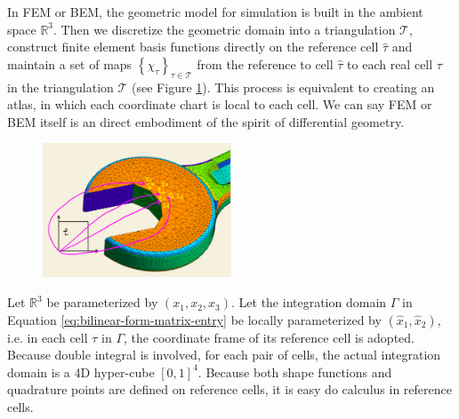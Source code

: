 \documentclass[11pt, a4paper]{book}
\begin{document}
In FEM or BEM, the geometric model for simulation is built in the ambient space
$\mathbb{R}^3$. Then we discretize the geometric domain into a triangulation
$\mathcal{T}$, construct finite element basis functions directly on the reference cell
$\hat{\tau}$ and maintain a set of maps
$\left\{ \chi_{\tau} \right\}_{\tau\in\mathcal{T}}$ from the reference to cell
$\hat{\tau}$ to each real cell $\tau$ in the triangulation $\mathcal{T}$ (see Figure
\ref{fig:mesh-manifold}). This process is equivalent to creating an atlas, in which each
coordinate chart is local to each cell. We can say FEM or BEM itself is an direct
embodiment of the spirit of differential geometry.
\begin{figure}[htbp]
  \centering
  \includegraphics[width=0.5\textwidth, height=\textheight, keepaspectratio]{figures/coordinate-chart-for-mesh-draft}
  \caption{}
  \label{fig:mesh-manifold}
\end{figure}

Let $\mathbb{R}^3$ be parameterized by $(x_1,x_2,x_3)$. Let the integration domain
$\Gamma$ in Equation \eqref{eq:bilinear-form-matrix-entry} be locally parameterized by
$(\hat{x}_1,\hat{x}_2)$, i.e. in each cell $\tau$ in $\Gamma$, the coordinate frame of its
reference cell is adopted. Because double integral is involved, for each pair of cells,
the actual integration domain is a 4D hyper-cube $[0,1]^4$. Because both shape functions
and quadrature points are defined on reference cells, it is easy do calculus in reference
cells.
\end{document}

